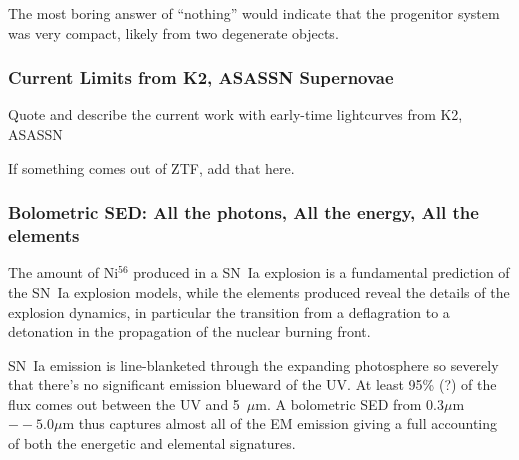 The most boring answer of ``nothing'' would indicate that the progenitor system was very compact, likely from two degenerate objects.  

\subsubsection{Current Limits from K2, ASASSN Supernovae}

{\tbd Quote and describe the current work with early-time lightcurves from K2, ASASSN}

{\tbd If something comes out of ZTF, add that here.}

\subsubsection{Bolometric SED: All the photons, All the energy, All the elements}
The amount of Ni$^{56}$ produced in a SN~Ia explosion is a fundamental prediction of the SN~Ia explosion models, while the elements produced reveal the details of the explosion dynamics, in particular the transition from a deflagration to a detonation in the propagation of the nuclear burning front.

SN~Ia emission is line-blanketed through the expanding photosphere so severely that there's no significant emission blueward of the UV.  At least 95\% (?) of the flux comes out between the UV and 5~$\mu$m.  A bolometric SED from $0.3\mu$m$--5.0\mu$m thus captures almost all of the EM emission giving a full accounting of both the energetic and elemental signatures.
